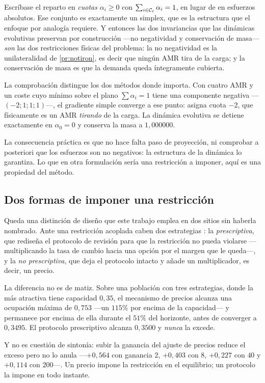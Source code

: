 \begin{observacion}
\label{obs:analogia}
Escríbase el reparto en \emph{cuotas} $\alpha_i\ge0$ con
$\sum_{i\in\mathcal{C}_\ell}\alpha_i=1$, en lugar de en esfuerzos absolutos. Ese
conjunto es exactamente un simplex, que es la estructura que el enfoque por
analogía requiere. Y entonces las dos invariancias que las dinámicas evolutivas
preservan por construcción —no negatividad y conservación de masa— \emph{son} las
dos restricciones físicas del problema: la no negatividad es la unilateralidad
de \cref{pr:notiron}, es decir que ningún AMR tira de la carga; y la
conservación de masa es que la demanda queda íntegramente cubierta.

La comprobación distingue los dos métodos donde importa. Con cuatro AMR y un
coste cuyo mínimo sobre el plano $\sum\alpha_i=1$ tiene una componente negativa
—$(-2;1;1;1)$—, el gradiente simple converge a ese punto: asigna cuota $-2$, que
físicamente es un AMR \emph{tirando} de la carga. La dinámica evolutiva se
detiene exactamente en $\alpha_0=0$ y conserva la masa a $1{,}000000$.

La consecuencia práctica es que no hace falta paso de proyección, ni comprobar a
posteriori que los esfuerzos son no negativos: la estructura de la dinámica lo
garantiza. Lo que en otra formulación sería una restricción a imponer, aquí es
una propiedad del método.
\end{observacion}

\subsection{Dos formas de imponer una restricción}

Queda una distinción de diseño que este trabajo emplea en dos sitios sin haberla
nombrado. Ante una restricción acoplada caben dos estrategias
\cite{martinezPiazuelo2025gne}: la \emph{prescriptiva}, que rediseña el protocolo
de revisión para que la restricción no pueda violarse —multiplicando la tasa de
cambio hacia una opción por el margen que le queda—, y la \emph{no
prescriptiva}, que deja el protocolo intacto y añade un multiplicador, es decir,
un precio.

\begin{observacion}
\label{obs:prescriptivo}
La diferencia no es de matiz. Sobre una población con tres estrategias, donde la
más atractiva tiene capacidad $0{,}35$, el mecanismo de precios alcanza una
ocupación máxima de $0{,}753$ —un $115\%$ por encima de la capacidad— y permanece
por encima de ella durante el $51\%$ del horizonte, antes de converger a
$0{,}3495$. El protocolo prescriptivo alcanza $0{,}3500$ y \emph{nunca} la
excede.

Y no es cuestión de sintonía: subir la ganancia del ajuste de precios reduce el
exceso pero no lo anula —$+0{,}564$ con ganancia $2$, $+0{,}403$ con $8$,
$+0{,}227$ con $40$ y $+0{,}114$ con $200$—. Un precio impone la restricción en
el equilibrio; un protocolo la impone en todo instante.
\end{observacion}

